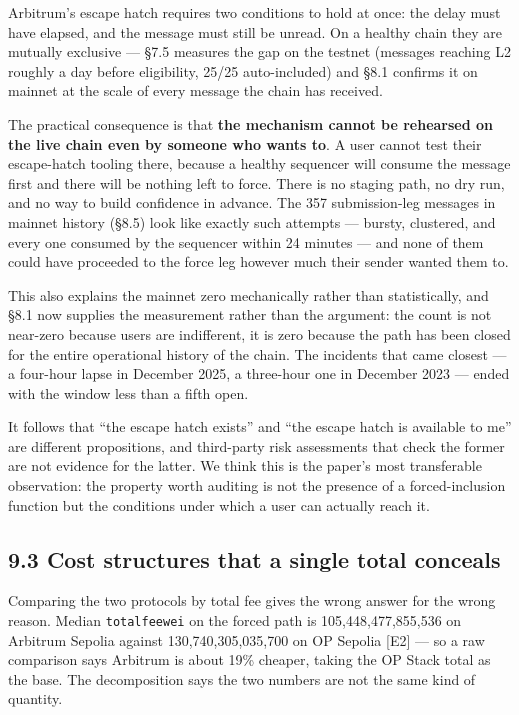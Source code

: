 \documentclass[conference]{IEEEtran}
\renewcommand{\_}{\textunderscore\allowbreak}
\begin{document}
Arbitrum's escape hatch requires two conditions to hold at once: the
delay must have elapsed, and the message must still be unread. On a
healthy chain they are mutually exclusive --- §7.5 measures the gap on
the testnet (messages reaching L2 roughly a day before eligibility,
25/25 auto-included) and §8.1 confirms it on mainnet at the scale of
every message the chain has received.

The practical consequence is that \textbf{the mechanism cannot be
rehearsed on the live chain even by someone who wants to}. A user cannot
test their escape-hatch tooling there, because a healthy sequencer will
consume the message first and there will be nothing left to force. There
is no staging path, no dry run, and no way to build confidence in
advance. The 357 submission-leg messages in mainnet history (§8.5) look
like exactly such attempts --- bursty, clustered, and every one consumed
by the sequencer within 24 minutes --- and none of them could have
proceeded to the force leg however much their sender wanted them to.

This also explains the mainnet zero mechanically rather than
statistically, and §8.1 now supplies the measurement rather than the
argument: the count is not near-zero because users are indifferent, it
is zero because the path has been closed for the entire operational
history of the chain. The incidents that came closest --- a four-hour
lapse in December 2025, a three-hour one in December 2023 --- ended with
the window less than a fifth open.

It follows that ``the escape hatch exists'' and ``the escape hatch is
available to me'' are different propositions, and third-party risk
assessments that check the former are not evidence for the latter. We
think this is the paper's most transferable observation: the property
worth auditing is not the presence of a forced-inclusion function but
the conditions under which a user can actually reach it.

\subsection{9.3 Cost structures that a single total
conceals}\label{cost-structures-that-a-single-total-conceals}

Comparing the two protocols by total fee gives the wrong answer for the
wrong reason. Median \texttt{total\_fee\_wei} on the forced path is
105,448,477,855,536 on Arbitrum Sepolia against 130,740,305,035,700 on
OP Sepolia {[}E2{]} --- so a raw comparison says Arbitrum is about 19\%
cheaper, taking the OP Stack total as the base. The decomposition says
the two numbers are not the same kind of quantity.
\end{document}
